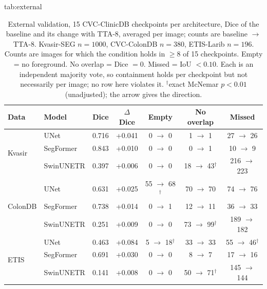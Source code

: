 \begin{table}[!t]
\floatconts
  {tab:external}%
  {\caption{External validation, 15 CVC-ClinicDB checkpoints per architecture, Dice of the baseline and its change with TTA-8, averaged per image; counts are baseline $\rightarrow$ TTA-8. Kvasir-SEG $n=1000$, CVC-ColonDB $n=380$, ETIS-Larib $n=196$. Counts are images for which the condition holds in $\geq$8 of 15 checkpoints. Empty = no foreground. No overlap = Dice $=0$. Missed = IoU $<0.10$. Each is an independent majority vote, so containment holds per checkpoint but not necessarily per image; no row here violates it. $^{\dagger}$exact McNemar $p<0.01$ (unadjusted); the arrow gives the direction.}}%
  {
  \begin{tabular}{@{}llccccc@{}}
  \toprule
  Data & Model & Dice & $\Delta$Dice & Empty & No overlap & Missed \\
  \midrule
  \multirow{3}{*}{Kvasir}  & UNet      & 0.716 & +0.041 & 0 $\rightarrow$ 0   & 1 $\rightarrow$ 1 & 27 $\rightarrow$ 26 \\
                           & SegFormer & 0.843 & +0.010 & 0 $\rightarrow$ 0   & 0 $\rightarrow$ 1 & 10 $\rightarrow$ 9 \\
                           & SwinUNETR & 0.397 & +0.006 & 0 $\rightarrow$ 0   & 18 $\rightarrow$ 43$^{\dagger}$ & 216 $\rightarrow$ 223 \\
  \midrule
  \multirow{3}{*}{ColonDB} & UNet      & 0.631 & +0.025 & 55 $\rightarrow$ 68$^{\dagger}$ & 70 $\rightarrow$ 70 & 74 $\rightarrow$ 76 \\
                           & SegFormer & 0.738 & +0.014 & 0 $\rightarrow$ 1   & 12 $\rightarrow$ 11 & 36 $\rightarrow$ 33 \\
                           & SwinUNETR & 0.251 & +0.009 & 0 $\rightarrow$ 0   & 73 $\rightarrow$ 99$^{\dagger}$ & 189 $\rightarrow$ 182 \\
  \midrule
  \multirow{3}{*}{ETIS}    & UNet      & 0.463 & +0.084 & 5 $\rightarrow$ 18$^{\dagger}$  & 33 $\rightarrow$ 33 & 55 $\rightarrow$ 46$^{\dagger}$ \\
                           & SegFormer & 0.691 & +0.030 & 0 $\rightarrow$ 0   & 8 $\rightarrow$ 7 & 17 $\rightarrow$ 16 \\
                           & SwinUNETR & 0.141 & +0.008 & 0 $\rightarrow$ 0   & 50 $\rightarrow$ 71$^{\dagger}$ & 145 $\rightarrow$ 144 \\
  \bottomrule
  \end{tabular}}
\end{table}

